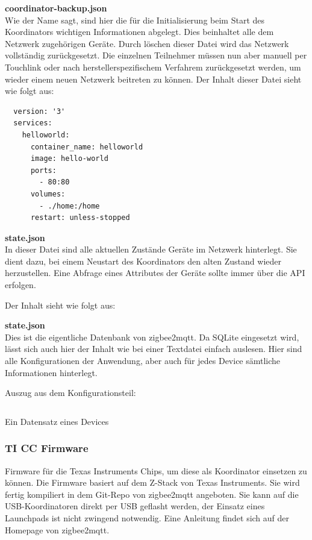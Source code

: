 \textbf{coordinator-backup.json}\\

Wie der Name sagt, sind hier die für die Initialisierung beim Start des Koordinators wichtigen Informationen abgelegt. Dies beinhaltet alle dem Netzwerk zugehörigen Geräte.
Durch löschen dieser Datei wird das Netzwerk vollständig zurückgesetzt. Die einzelnen Teilnehmer müssen nun aber manuell per Touchlink oder nach herstellerspezifischem Verfahrem
zurückgesetzt werden, um wieder einem neuen Netzwerk beitreten zu können.
Der Inhalt dieser Datei sieht wie folgt aus:
\begin{lstlisting}
  version: '3'
  services:
    helloworld:
      container_name: helloworld
      image: hello-world
      ports:
        - 80:80
      volumes:
        - ./home:/home
      restart: unless-stopped
  \end{lstlisting}

  \textbf{state.json}\\

  In dieser Datei sind alle aktuellen Zustände Geräte im Netzwerk hinterlegt. Sie dient dazu, bei einem Neustart des Koordinators den alten Zustand wieder herzustellen.
  Eine Abfrage eines Attributes der Geräte sollte immer über die API erfolgen.

  Der Inhalt sieht wie folgt aus:

  \textbf{state.json}\\

  Dies ist die eigentliche Datenbank von zigbee2mqtt. Da SQLite eingesetzt wird, lässt sich auch hier der Inhalt wie bei einer Textdatei einfach auslesen. Hier sind alle
  Konfigurationen der Anwendung, aber auch für jedes Device sämtliche Informationen hinterlegt.

  Auszug aus dem Konfigurationsteil:
  \begin{lstlisting}
  \end{lstlisting}

  Ein Datensatz eines Devices



\subsubsection{TI CC Firmware}

Firmware für die Texas Instruments Chips, um diese als Koordinator einsetzen zu können. Die Firmware basiert auf dem Z-Stack von Texas Instruments. Sie wird fertig kompiliert
in dem Git-Repo von zigbee2mqtt angeboten. Sie kann auf die USB-Koordinatoren direkt per USB geflasht werden, der Einsatz eines Launchpads ist nicht zwingend notwendig. Eine Anleitung
findet sich auf der Homepage von zigbee2mqtt.  


